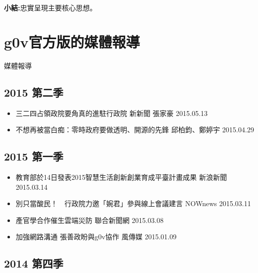 \textbf{小結:}忠實呈現主要核心思想。

\section{g0v官方版的媒體報導}  

媒體報導 

\subsection{2015 第二季}

\begin{itemize}
\item 三二四占領政院要角真的進駐行政院 新新聞 張家豪 2015.05.13
\item 不想再被當白痴：零時政府要做透明、開源的先鋒 邱柏鈞、鄭婷宇 2015.04.29
\end{itemize}

\subsection{2015 第一季}

\begin{itemize}
\item 教育部於14日發表2015智慧生活創新創業育成平臺計畫成果 新浪新聞 2015.03.14
\item 別只當酸民！　行政院力邀「婉君」參與線上會議建言 NOWnews 2015.03.11
\item 產官學合作催生雲端災防 聯合新聞網 2015.03.08
\item 加強網路溝通 張善政盼與g0v協作 風傳媒 2015.01.09
\end{itemize}

\subsection{2014 第四季}

